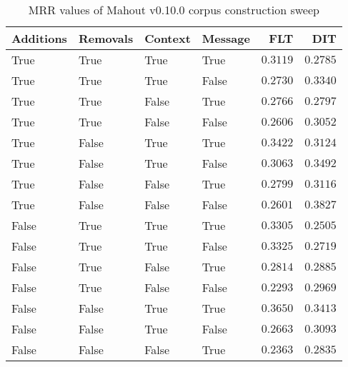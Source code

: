 
\begin{table}
\begin{spacing}{1.2}
\centering
\caption{MRR values of Mahout v0.10.0 corpus construction sweep}
\label{table:mahout_corpus_sweep}
\vspace{0.2em}
\begin{tabular}{llll|rr}
\toprule
Additions & Removals & Context & Message & FLT &        DIT \\
\midrule
     True &     True &    True &    True &         $0.3119$ &      $0.2785$ \\
     True &     True &    True &   False &         $0.2730$ &      $0.3340$ \\
     True &     True &   False &    True &         $0.2766$ &      $0.2797$ \\
     True &     True &   False &   False &         $0.2606$ &      $0.3052$ \\
     True &    False &    True &    True &         $0.3422$ &      $0.3124$ \\
     True &    False &    True &   False &         $0.3063$ &      $0.3492$ \\
     True &    False &   False &    True &         $0.2799$ &      $0.3116$ \\
     True &    False &   False &   False &         $0.2601$ & $\bm{0.3827}$ \\
    False &     True &    True &    True &         $0.3305$ &      $0.2505$ \\
    False &     True &    True &   False &         $0.3325$ &      $0.2719$ \\
    False &     True &   False &    True &         $0.2814$ &      $0.2885$ \\
    False &     True &   False &   False &         $0.2293$ &      $0.2969$ \\
    False &    False &    True &    True &    $\bm{0.3650}$ &      $0.3413$ \\
    False &    False &    True &   False &         $0.2663$ &      $0.3093$ \\
    False &    False &   False &    True &         $0.2363$ &      $0.2835$ \\
\bottomrule
\end{tabular}

\end{spacing}
\end{table}
